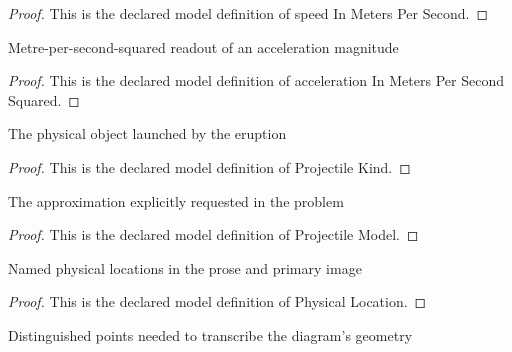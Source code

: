 \begin{proof}
  This is the declared model definition of speed In Meters Per Second.
\end{proof}
\begin{definition}
  \label{def:physics:phyx-mini-0752:phyxminiproblems-problemphyxmini0752-accelerationinmeterspersecondsquared}
  Metre-per-second-squared readout of an acceleration magnitude
\end{definition}
\begin{proof}
  This is the declared model definition of acceleration In Meters Per Second Squared.
\end{proof}
\begin{definition}
  \label{def:physics:phyx-mini-0752:phyxminiproblems-problemphyxmini0752-projectilekind}
  The physical object launched by the eruption
\end{definition}
\begin{proof}
  This is the declared model definition of Projectile Kind.
\end{proof}
\begin{definition}
  \label{def:physics:phyx-mini-0752:phyxminiproblems-problemphyxmini0752-projectilemodel}
  The approximation explicitly requested in the problem
\end{definition}
\begin{proof}
  This is the declared model definition of Projectile Model.
\end{proof}
\begin{definition}
  \label{def:physics:phyx-mini-0752:phyxminiproblems-problemphyxmini0752-physicallocation}
  Named physical locations in the prose and primary image
\end{definition}
\begin{proof}
  This is the declared model definition of Physical Location.
\end{proof}
\begin{definition}
  \label{def:physics:phyx-mini-0752:phyxminiproblems-problemphyxmini0752-figurepoint}
  Distinguished points needed to transcribe the diagram's geometry
\end{definition}
